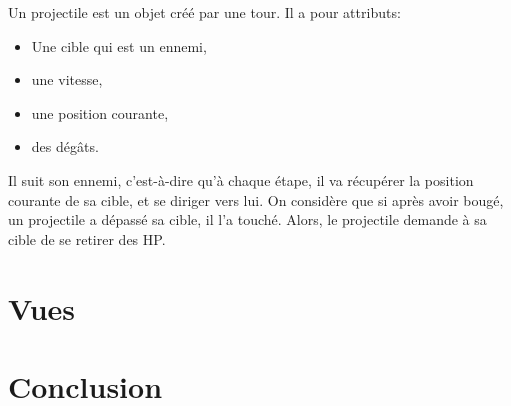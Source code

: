 \documentclass[a4paper,11pt]{article}
\begin{document}
Un projectile est un objet créé par une tour. Il a pour attributs:
\begin{itemize}
    \item Une cible qui est un ennemi,
    \item une vitesse,
    \item une position courante,
    \item des dégâts.
\end{itemize}

Il suit son ennemi, c'est-à-dire qu'à chaque étape, il va récupérer la position
courante de sa cible, et se diriger vers lui. On considère que si après avoir bougé,
un projectile a dépassé sa cible, il l'a touché. Alors, le projectile demande à
sa cible de se retirer des HP.

\section{Vues}


\section{Conclusion} %

\end{document}
